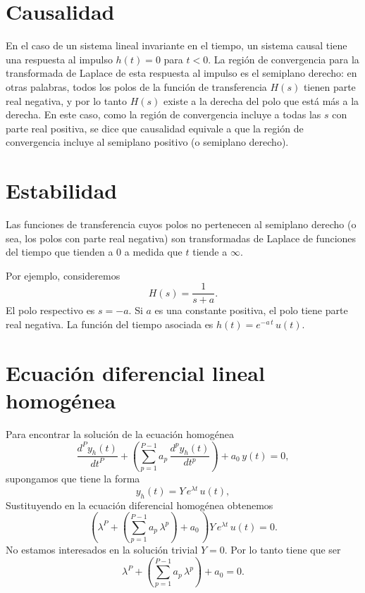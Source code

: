 \section{Causalidad}

En el caso de un sistema lineal invariante en el tiempo, un sistema causal tiene una respuesta al impulso $h(t) = 0$ para $t < 0$. La región de convergencia para la transformada de Laplace de esta respuesta al impulso es el semiplano derecho: en otras palabras, todos los polos de la función de transferencia $H(s)$ tienen parte real negativa, y por lo tanto $H(s)$ existe a la derecha del polo que está más a la derecha. En este caso, como la región de convergencia incluye a todas las $s$ con parte real positiva, se dice que causalidad equivale a que la región de convergencia incluye al semiplano positivo (o semiplano derecho).

\section{Estabilidad}

Las funciones de transferencia cuyos polos no pertenecen al semiplano derecho (o sea, los polos con parte real negativa) son transformadas de Laplace de funciones del tiempo que tienden a $0$ a medida que $t$ tiende a $\infty$.

Por ejemplo, consideremos
\begin{equation}
	H(s) = \frac{1}{s + a}.
\end{equation}
El polo respectivo es $s=-a$. Si $a$ es una constante positiva, el polo tiene parte real negativa. La funci\'{o}n del tiempo 
asociada es $h(t) = e^{-a \, t} \, u(t)$.


\section{Ecuaci\'{o}n diferencial lineal homog\'{e}nea}

Para encontrar la soluci\'{o}n de la ecuaci\'{o}n homog\'{e}nea 
\begin{equation}
        \frac{d^{P}y_{h}\left( t\right) }{dt^{P}} +
        \left(\sum_{p=1}^{P-1}a_{p} \, \frac{d^{p}y_{h}\left( t\right) }{dt^{p}}\right) + a_{0} \, y(t)=0,
\end{equation}
supongamos que tiene la forma 
\begin{equation}
        y_{h}\left( t\right) = Y \, e^{\lambda t} \, u(t),
\end{equation}
Sustituyendo en la ecuaci\'{o}n diferencial homog\'{e}nea obtenemos 
\begin{equation}
                \left(\lambda^{P} + \left(
                \sum_{p=1}^{P-1}a_{p} \, \lambda^{p}\right) + a_{0} \, \right) Y \, e^{\lambda t} \, u(t) = 0.
\end{equation}
No estamos interesados en la soluci\'{o}n trivial $Y=0$. Por lo tanto
tiene que ser 
\begin{equation}
        \lambda^{P} + \left(\sum_{p=1}^{P-1}a_{p} \, \lambda^{p}\right) + a_{0} = 0. \label{carpol}
\end{equation}

